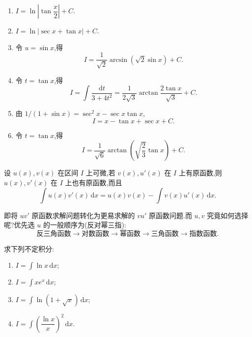 \begin{solution}
    \leavevmode
    \begin{enumerate}
        \item $\displaystyle I=\ln\left|\tan\dfrac{x}{2}\right|+C$.
        \item $\displaystyle I=\ln|\sec x+\tan x|+C$.
        \item 令 $u=\sin x$,得
              \[
                  I=\dfrac{1}{\sqrt2}\arcsin(\sqrt2\sin x)+C.
              \]
        \item 令 $t=\tan x$,得
              \[
                  I=\int\dfrac{\mathrm{d}t}{3+4t^2}
                  =\dfrac{1}{2\sqrt3}\arctan\dfrac{2\tan x}{\sqrt3}+C.
              \]
        \item 由 $1/(1+\sin x)=\sec^2x-\sec x\tan x$,
              \[
                  I=x-\tan x+\sec x+C.
              \]
        \item 令 $t=\tan x$,得
              \[
                  I=\dfrac{1}{\sqrt6}\arctan\left(\sqrt{\dfrac{2}{3}}\tan x\right)+C.
              \]
    \end{enumerate}
\end{solution}

\begin{theorem}
    设 $u(x),v(x)$ 在区间 $I$ 上可微,若 $v(x),u'(x)$ 在 $I$ 上有原函数,则 $u(x),v'(x)$ 在 $I$ 上也有原函数,而且
    \[
        \displaystyle\int u(x)v'(x)\,\mathrm{d}x
        =u(x)v(x)-\int v(x)u'(x)\,\mathrm{d}x.
    \]
\end{theorem}

\begin{remark}
    即将 $uv'$ 原函数求解问题转化为更易求解的 $vu'$ 原函数问题.而 $u,v$ 究竟如何选择呢?优先选 $u$ 的一般顺序为(反对幂三指):
    \[
        \text{反三角函数}\longrightarrow\text{对数函数}\longrightarrow\text{幂函数}
        \longrightarrow\text{三角函数}\longrightarrow\text{指数函数}.
    \]
\end{remark}

\begin{example}
    求下列不定积分:
    \begin{enumerate}
        \item $\displaystyle I=\int\ln x\,\mathrm{d}x$;
        \item $\displaystyle I=\int xe^x\,\mathrm{d}x$;
        \item $\displaystyle I=\int\ln(1+\sqrt{x})\,\mathrm{d}x$;
        \item $\displaystyle I=\int\left(\dfrac{\ln x}{x}\right)^2\,\mathrm{d}x$.
    \end{enumerate}
\end{example}
\exampleblank

